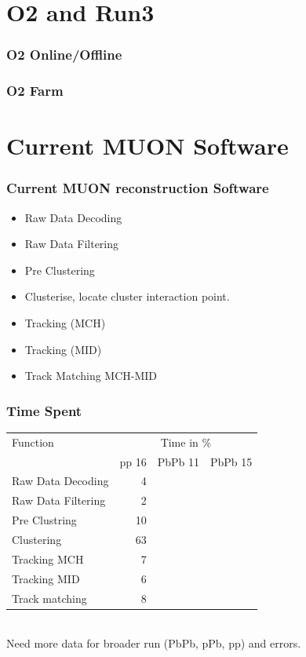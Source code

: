 \documentclass{beamer}
\begin{document}
\section{O2 and Run3}
\begin{frame}
\frametitle{O2 Online/Offline}


\end{frame}
\begin{frame}
  \frametitle{O2 Farm}

\end{frame}

\section{Current MUON Software}

\begin{frame}
\frametitle{Current MUON reconstruction Software}
\begin{itemize}
  \item Raw Data Decoding
  \item Raw Data Filtering
  \item Pre Clustering
  \item Clusterise, locate cluster interaction point.
  \item Tracking (MCH)
  \item Tracking (MID)
  \item Track Matching MCH-MID
\end{itemize}
\end{frame}


\begin{frame}
  \frametitle{Time Spent}

\begin{tabular}{|l|r|r|r|}
  Function & \multicolumn{3}{c}{Time in \%} \\  
  & pp 16  & PbPb 11 & PbPb 15\\ \hline 
Raw Data Decoding & 4 & &\\
Raw Data Filtering & 2 & &\\
Pre Clustring & 10 & &\\
Clustering & 63 & & \\
Tracking MCH & 7 & & \\
Tracking MID & 6 & & \\
Track matching & 8 & & \\
\end{tabular}\\

Need more data for broader run (PbPb, pPb, pp) and errors.
\end{frame}
\end{document}
